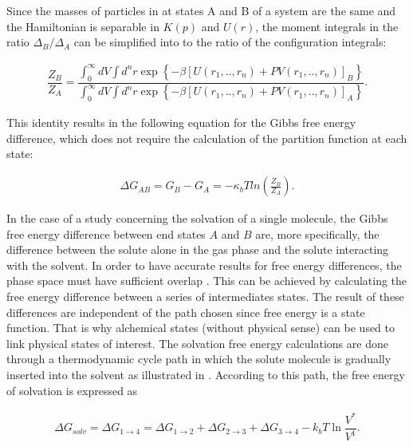 	Since the masses of particles in at states A and B of a system are the same and the Hamiltonian is separable in $K(p)$ and $U(r)$, the moment integrals in the ratio ${\Delta_{B}}/{\Delta_{A}}$ can be simplified into to the ratio of the configuration integrals:
	
	\begin{equation}
	\label{eq:partiso}
	\begin{aligned}
	\dfrac{Z_{B}}{Z_{A}} = \dfrac{\int_{0}^{\infty} dV \int d^{n}r \exp \left\lbrace -\beta \left[U(r_{1},..,r_{n}) + PV(r_{1},..,r_{n}) \right]_{B} \right\rbrace}{\int_{0}^{\infty} dV \int d^{n}r \exp \left\lbrace  -\beta \left[U(r_{1},..,r_{n}) + PV(r_{1},..,r_{n}) \right]_{A} \right\rbrace }.
	\end{aligned}
	\end{equation}
	
	This identity results in the following equation for the Gibbs free energy difference, which does not  require the calculation of the partition function at each state:
	
	\begin{equation}
	\label{eq:dif}
	\begin{aligned}
	\Delta G_{AB} = G_{B} - G_{A}= -\kappa_{b}T ln \left( \frac{Z_{B}}{Z_{A}}\right).
	\end{aligned}
	\end{equation}
	
	In the case of a study concerning the solvation of a single molecule, the Gibbs free energy difference between end states $A$ and $B$ are, more specifically, the difference between the solute alone in the gas phase and the solute interacting with the solvent. In order to have accurate results for free energy differences, the phase space must have sufficient overlap  \cite{klimovich}. This can be achieved by calculating the free energy difference between a series of intermediates states. The result of these differences are independent of the path chosen since free energy is a state function. That is why alchemical states (without physical sense) can be used to link physical states of interest. The solvation free energy calculations are done through a thermodynamic cycle path in which the solute molecule is gradually inserted into the solvent as illustrated in . According to this path, the free energy of solvation is expressed as
	
	\begin{equation}
	\label{eq:freesolv}
	\begin{aligned}
	\Delta G_{solv} = \Delta G_{1 \rightarrow 4} = \Delta G_{1 \rightarrow 2} + \Delta G_{2 \rightarrow 3} + \Delta G_{3 \rightarrow 4}  - k_{b}T \ln \dfrac{V^{*}}{V^{1}} .
	\end{aligned}
	\end{equation}
	
